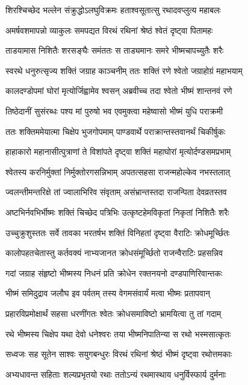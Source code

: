 \twolineshloka
{शिरश्चिच्छेद भल्लेन संक्रुद्धोऽलघुविक्रमः}
{हताश्वसूतात्सु रथादवप्लुत्य महाबलः}


\twolineshloka
{अमर्षवशमापन्नो व्याकुलः समपद्यत}
{विरथं रथिनां श्रेष्ठं श्वेतं दृष्ट्वा पितामहः}


\twolineshloka
{ताडयामास निशितैः शरसङ्घैः समंततः}
{स ताड्यमानः समरे भीष्मचापच्युतैः शरैः}


\twolineshloka
{स्वरथे धनुरुत्सृज्य शक्तिं जग्राह काञ्चनीम्}
{ततः शक्तिं रणे श्वेतो जग्राहोग्रं महाभयाम्}


\twolineshloka
{कालदण्डोपमां घोरां मृत्योर्जिह्वामेव श्वसन्}
{अब्रवीच्च तदा श्वेतो भीष्मं शान्तनवं रणे}


\twolineshloka
{तिष्ठेदानीं सुसंरब्धः पश्य मां पुरुषो भव}
{एवमुक्त्वा महेष्वासो भीष्मं युधि पराक्रमी}


\twolineshloka
{ततः शक्तिममेयात्मा चिक्षेप भुजगोपमाम्}
{पाण्डवार्थे पराक्रान्तस्तवानर्थं चिकीर्षुकः}


\twolineshloka
{हाहाकारो महानासीत्पुत्राणां ते विशांपते}
{दृष्ट्वा शक्तिं महाघोरां मृत्योर्दण्डसमप्रभाम्}


\twolineshloka
{श्वेतस्य करनिर्मुक्तां निर्मुक्तोरगसन्निभाम्}
{अपतत्सहसा राजन्महोल्केव नभस्तलात्}


\twolineshloka
{ज्वलन्तीमन्तरिक्षे तां ज्वालाभिरिव संवृताम्}
{असंभ्रान्तस्तदा राजन्पिता देवव्रतस्तव}


\twolineshloka
{अष्टभिर्नवभिर्भीष्मः शक्तिं चिच्छेद पत्रिभिः}
{उत्कृष्टहेमविकृतां निकृतां निशितैः शरैः}


\twolineshloka
{उच्चुक्रुशुस्ततः सर्वे तावका भरतर्षभ}
{शक्तिं विनिहतां दृष्ट्वा वैराटिः क्रोधमूर्च्छितः}


\twolineshloka
{कालोपहतचेतास्तु कर्तवक्यं नाभ्यजानत}
{क्रोधसंमूर्च्छितो राजन्वैराटिः प्रहसन्निव}


\twolineshloka
{गदां जग्राह संहृष्टो भीष्मस्य निधनं प्रति}
{क्रोधेन रक्तनयनो दण्डपाणिरिवान्तकः}


\twolineshloka
{भीष्मं समिदुद्राव जलौघ इव पर्वतम्}
{तस्य वेगमसंवार्यं मत्वा भीष्मः प्रतापवान्}


\twolineshloka
{प्रहारविप्रमोक्षार्थं सहसा धरणींगतः}
{श्वेतः क्रोधसमाविष्टो भ्रामयित्वा तु तां गदाम्}


\twolineshloka
{रथे भीष्मस्य चिक्षेप यथा देवो धनेश्वरः}
{तया भीष्मनिपातिन्या स रथो भस्मसात्कृतः}


\twolineshloka
{सध्वजः सह सूतेन साश्वः सयुगबन्धुरः}
{विरथं रथिनां श्रेष्ठं भीष्मं दृष्ट्वा रथोत्तमकाः}


\twolineshloka
{अभ्यधावन्त सहिताः शल्यप्रभृतयो रथाः}
{ततोऽन्यं रथमास्थाय धनुर्विस्फार्य दुर्मनाः}



